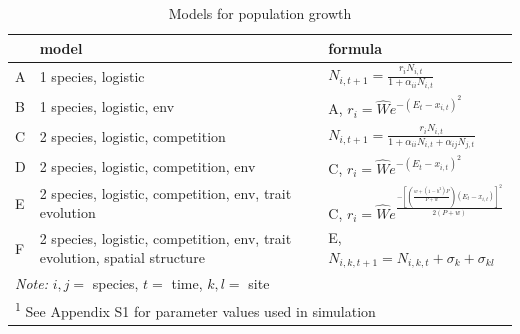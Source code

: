 \documentclass[
]{article}
\begin{document}
\begin{table}

\caption{\label{tab:tab1}Models for population growth}
\centering
\begin{tabular}[t]{lll}
\toprule
  & model & formula\\
\midrule
A & 1 species, logistic & $N_{i,t+1} = \frac{r_i N_{i,t}}{1+\alpha_{ii} N_{i,t}}$\\
B & 1 species, logistic, env & A, $r_i = \hat{W}e^{-(E_t - x_{i,t})^2}$\\
C & 2 species, logistic, competition & $N_{i,t+1} = \frac{r_i N_{i,t}}{1+\alpha_{ii} N_{i,t} + \alpha_{ij} N_{j,t}}$\\
D & 2 species, logistic, competition, env & C, $r_i = \hat{W}e^{-(E_t - x_{i,t})^2}$\\
E & 2 species, logistic, competition, env, trait evolution & C, $r_i = \hat{W}e^\frac{-[(\frac{w+(1-h^2)P}{P+w})(E_t - x_{i,t})]^2}{2 (P+w)}$\\
\addlinespace
F & 2 species, logistic, competition, env, trait evolution, spatial structure & E, $N_{i,k,t+1} = N_{i,k,t} + \sigma_k + \sigma_{kl}$\\
\bottomrule
\multicolumn{3}{l}{\rule{0pt}{1em}\textit{Note: } $i,j=$ species, $t=$ time, $k,l=$ site}\\
\multicolumn{3}{l}{\rule{0pt}{1em}\textsuperscript{1} See Appendix S1 for parameter values used in simulation}\\
\end{tabular}
\end{table}
\end{document}
